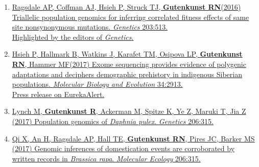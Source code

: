 \documentclass[11pt]{article}
\begin{document}
\begin{enumerate}
\item \href{http://doi.org/10.1534/genetics.115.184812}{Ragsdale AP\trainee, Coffman AJ\trainee, Hsieh P\trainee, Struck TJ\trainee, \textbf{Gutenkunst RN}\corresponding (2016) Triallelic population genomics for inferring correlated fitness effects of same site nonsynonymous mutations. \emph{Genetics} 203:513.}\\
 \href{http://www.genetics.org/content/203/1/NP}{Highlighted by the editors of \emph{Genetics}.}



\item \href{https://doi.org/10.1093/molbev/msx226}{Hsieh P\trainee, Hallmark B, Watkins J, Karafet TM, Osipova LP, \textbf{Gutenkunst RN}\corresponding, Hammer MF\corresponding (2017) Exome sequencing provides evidence of polygenic adaptations and deciphers demographic prehistory in indigenous Siberian populations. \emph{Molecular Biology and Evolution} 34:2913.}\\
  \href{https://www.eurekalert.org/pub_releases/2017-09/mbae-ccf090817.php}{Press release on EurekaAlert.}

\item \href{http://doi.org/10.1534/genetics.116.190611}{Lynch M\corresponding, \textbf{Gutenkunst R}, Ackerman M, Spitze K, Ye Z, Maruki T, Jia Z (2017) Population genomics of \emph{Daphnia pulex}. \emph{Genetics} 206:315.}

\item \href{http://doi.org/10.1111/mec.14131}{Qi X\corresponding, An H, Ragsdale AP\trainee, Hall TE, \textbf{Gutenkunst RN}, Pires JC, Barker MS (2017) Genomic inferences of domestication events are corroborated by written records in \textit{Brassica rapa}. \emph{Molecular Ecology} 206:315.}


\end{enumerate}
\end{document}
